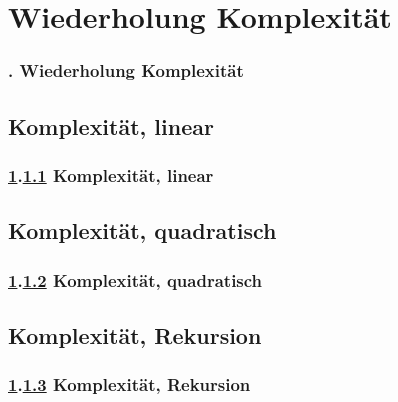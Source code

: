\def\stitle{Wiederholung Komplexität}
\section{\stitle}\label{K:wdh}
\begin{frame}
  \frametitle{\kap. \stitle}%
\tableofcontents[current]
\end{frame}
\def\stitle{Komplexit\"at, linear}
\subsection{\stitle}\label{S:Lin}
\begin{frame}[t]%
  \frametitle{\ref{K:wdh}.\ref{S:Lin} \stitle}
\medskip




\end{frame}


\def\stitle{Komplexit\"at, quadratisch}
\subsection{\stitle}\label{S:Quad}
\begin{frame}[t]%
  \frametitle{\ref{K:wdh}.\ref{S:Quad} \stitle}
\medskip


\end{frame}

\def\stitle{Komplexit\"at, Rekursion}
\subsection{\stitle}\label{S:Rek}
\begin{frame}[t]%
  \frametitle{\ref{K:wdh}.\ref{S:Rek} \stitle}
\medskip


\end{frame}
